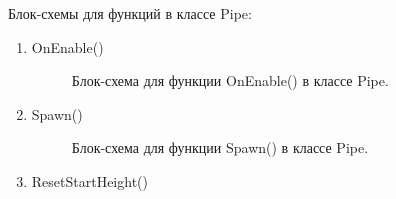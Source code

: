\documentclass[14pt, oneside]{altsu-report}
\begin{document}
Блок-схемы для функций в классе Pipe:
\begin{enumerate}
\item OnEnable()

\begin{figure}[H]
\caption{Блок-схема для функции  OnEnable() в классе Pipe.}
\end{figure}

\item Spawn()

\begin{figure}[H]
\caption{Блок-схема для функции Spawn() в классе Pipe.}
\end{figure}

\item ResetStartHeight()


\end{enumerate}
\end{document}
